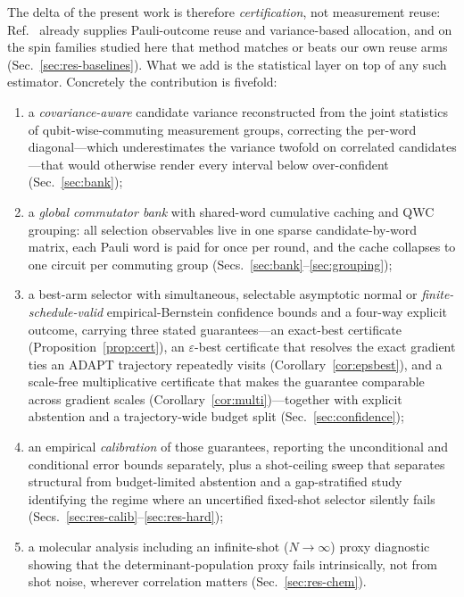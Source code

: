 \documentclass[aps,pra,reprint,superscriptaddress,nofootinbib,floatfix]{revtex4-2}
\begin{document}
The delta of the present work is therefore \emph{certification}, not measurement reuse: Ref.~\cite{ikhtiarudin2025shot} already supplies Pauli-outcome reuse and variance-based allocation, and on the spin families studied here that method matches or beats our own reuse arms (Sec.~\ref{sec:res-baselines}). What we add is the statistical layer on top of any such estimator. Concretely the contribution is fivefold:
\begin{enumerate}
    \item a \emph{covariance-aware} candidate variance reconstructed from the joint statistics of qubit-wise-commuting measurement groups, correcting the per-word diagonal---which underestimates the variance twofold on correlated candidates---that would otherwise render every interval below over-confident (Sec.~\ref{sec:bank});
    \item a \emph{global commutator bank} with shared-word cumulative caching and QWC grouping: all selection observables live in one sparse candidate-by-word matrix, each Pauli word is paid for once per round, and the cache collapses to one circuit per commuting group (Secs.~\ref{sec:bank}--\ref{sec:grouping});
    \item a best-arm selector with simultaneous, selectable asymptotic normal or \emph{finite-schedule-valid} empirical-Bernstein confidence bounds and a four-way explicit outcome, carrying three stated guarantees---an exact-best certificate (Proposition~\ref{prop:cert}), an $\varepsilon$-best certificate that resolves the exact gradient ties an ADAPT trajectory repeatedly visits (Corollary~\ref{cor:epsbest}), and a scale-free multiplicative certificate that makes the guarantee comparable across gradient scales (Corollary~\ref{cor:multi})---together with explicit abstention and a trajectory-wide budget split (Sec.~\ref{sec:confidence});
    \item an empirical \emph{calibration} of those guarantees, reporting the unconditional and conditional error bounds separately, plus a shot-ceiling sweep that separates structural from budget-limited abstention and a gap-stratified study identifying the regime where an uncertified fixed-shot selector silently fails (Secs.~\ref{sec:res-calib}--\ref{sec:res-hard});
    \item a molecular analysis including an infinite-shot ($N\to\infty$) proxy diagnostic showing that the determinant-population proxy fails intrinsically, not from shot noise, wherever correlation matters (Sec.~\ref{sec:res-chem}).
\end{enumerate}
\end{document}
